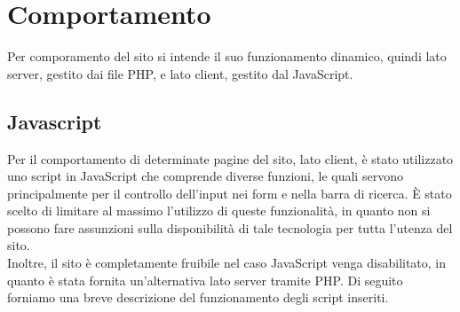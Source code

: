 \section{Comportamento}
Per comporamento del sito si intende il suo funzionamento dinamico, quindi
lato server, gestito dai file PHP, e lato client, gestito dal JavaScript.

\subsection{Javascript}
Per il comportamento di determinate pagine del sito, lato client, è stato utilizzato uno script in JavaScript che comprende diverse funzioni, le quali servono principalmente per il controllo dell’input nei form e nella barra di ricerca. È stato scelto di limitare al massimo l’utilizzo di queste funzionalità, in quanto non si possono fare assunzioni sulla disponibilità di tale tecnologia per tutta l’utenza del sito.\\
Inoltre, il sito è completamente fruibile nel caso JavaScript venga disabilitato,
in quanto è stata fornita un’alternativa lato server tramite PHP. Di seguito forniamo una breve descrizione del funzionamento degli script inseriti.

